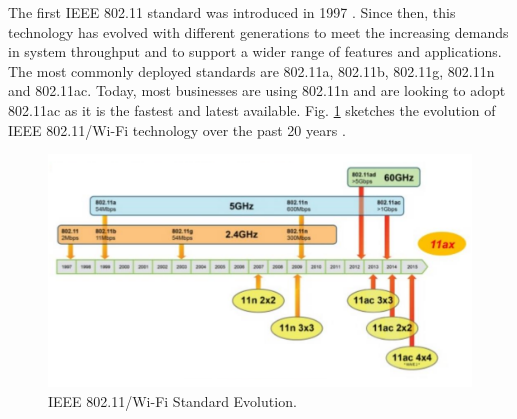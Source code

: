 The first IEEE 802.11 standard was introduced in 1997 \cite{ieee-history}. Since then, this technology has evolved with different generations to meet the increasing demands in system throughput and to support a wider range of features and applications. The most commonly deployed standards are 802.11a, 802.11b, 802.11g, 802.11n and 802.11ac. Today, most businesses are using 802.11n and are looking to adopt 802.11ac as it is the fastest and latest available. Fig. \ref{figs:Wi-Fi-evolution} sketches the evolution of IEEE 802.11/\mbox{Wi-Fi} technology over the past 20 years \cite{ieee-history}\cite{80211ac}\cite{80211ad}.
\begin{figure}[!ht]
	\centering
	\includegraphics[width=1.0\columnwidth]{figs/Wi-Fi-evolution}
	\caption{IEEE 802.11/\mbox{Wi-Fi} Standard Evolution.}
	\label{figs:Wi-Fi-evolution}
\end{figure}
